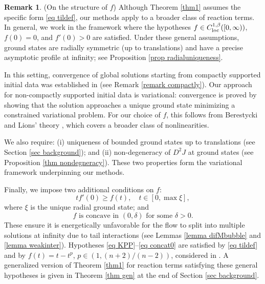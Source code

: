 \documentclass[11pt,letterpaper,reqno]{amsart}
\theoremstyle{plain}%
\theoremstyle{definition}
\newtheorem{remark}[theorem]{Remark}
\numberwithin{equation}{section}
\numberwithin{figure}{section}
\begin{document}
\begin{remark}\label{remark hypf}(On the structure of $f$)
   Although Theorem \ref{thm1} assumes the specific form \eqref{eq tildef}, our methods apply to a broader class of reaction terms. In general, we work in the framework where the hypotheses $f \in C^{1,\beta}_{\rm loc}([0,\infty))$, $f(0)=0$, and $f'(0)>0$ are satisfied. Under these general assumptions, ground states are radially symmetric (up to translations) and have a precise asymptotic profile at infinity; see Proposition \ref{prop radialuniqueness}.

   In this setting, convergence of global solutions starting from compactly supported initial data was established in \cite{busca2002convergence} (see Remark \ref{remark compactly}). Our approach for non-compactly supported initial data is variational: convergence is proved by showing that the solution approaches a unique ground state minimizing a constrained variational problem. For our choice of $f$, this follows from Berestycki and Lions' theory \cite{berestycki1980existence}, which covers a broader class of nonlinearities. 

   We also require: (i)  uniqueness of bounded ground states up to translations (see Section \ref{sec background}); and (ii)  non-degeneracy of $D^2J$ at ground states (see Proposition \ref{thm nondegneracy}). These two properties form the variational framework underpinning our methods.  

   Finally, we impose two additional conditions on $f$:
\begin{equation}\label{eq KPP} \tag{H1}
t f'(0) \ge f(t), \quad t \in [0, \max \xi],
\end{equation}
where $\xi$ is the unique radial ground state; and
\begin{equation}\label{eq concat0}\tag{H2}
f \text{ is concave in } (0,\delta) \text{ for some } \delta>0.
\end{equation}
These ensure it is energetically unfavorable for the flow to split into multiple solutions at infinity due to tail interactions (see Lemmas \ref{lemma difMbubble} and \ref{lemma weakinter}). Hypotheses \eqref{eq KPP}--\eqref{eq concat0} are satisfied by \eqref{eq tildef} and by $f(t) = t - t^p$, $p \in (1, (n+2)/(n-2))$, considered in \cite{cortazar1999uniqueness}.  
   A generalized version of Theorem \ref{thm1} for reaction terms satisfying these general hypotheses is given in Theorem \ref{thm gen} at the end of Section \ref{sec background}.
\end{remark}
\end{document}
